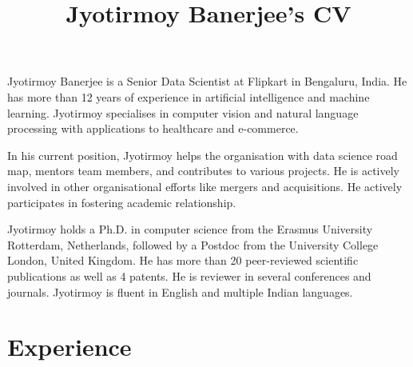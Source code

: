 \documentclass[a4paper,online]{adcv}
\title{Jyotirmoy Banerjee’s CV}
\begin{document}
Jyotirmoy Banerjee is a Senior Data Scientist at Flipkart in Bengaluru, India. He has more than 12 years of experience in artificial intelligence and machine learning.
Jyotirmoy specialises in computer vision and natural language processing with applications to healthcare and e-commerce.

In his current position, Jyotirmoy helps the organisation with data science road map, mentors team members, and contributes to various projects. 
He is actively involved in other organisational efforts like mergers and acquisitions. He actively participates in fostering academic relationship.

Jyotirmoy holds a Ph.D. in computer science from the Erasmus University Rotterdam, Netherlands, followed by a Postdoc from the University College London, United Kingdom. He has more than 20 peer-reviewed scientific publications as well as 4 patents. He is reviewer in several conferences and journals.
Jyotirmoy is fluent in English and multiple Indian languages.

\section{Experience}
\end{document}
